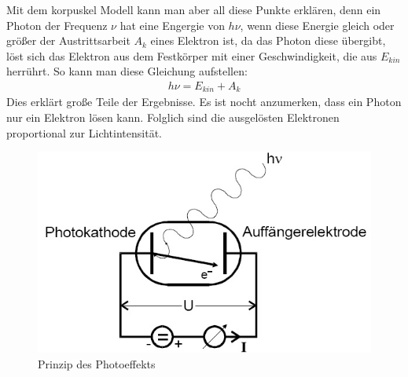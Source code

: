 Mit dem korpuskel Modell kann man aber all diese Punkte erklären, denn ein Photon der Frequenz
$\nu$ hat eine Engergie von $h \nu$, wenn diese Energie gleich oder größer der Austrittsarbeit $A_k$ eines Elektron ist,
da das Photon diese übergibt, löst sich das Elektron aus dem Festkörper mit einer Geschwindigkeit, die aus $E_{kin}$ herrührt.
So kann man diese Gleichung aufstellen:
\begin{align}
h \nu = E_{kin} + A_k
\end{align}
Dies erklärt große Teile der Ergebnisse. Es ist nocht anzumerken, dass ein Photon nur ein Elektron lösen kann. Folglich sind die ausgelösten Elektronen proportional zur Lichtintensität.

\begin{figure}[h]
	\centering
		\includegraphics[width=1.00\textwidth]{PrinzipDesPhotoeffekts.jpg}
		\caption{Prinzip des Photoeffekts}
	\label{fig:PrinzipDesPhotoeffekts}
\end{figure}